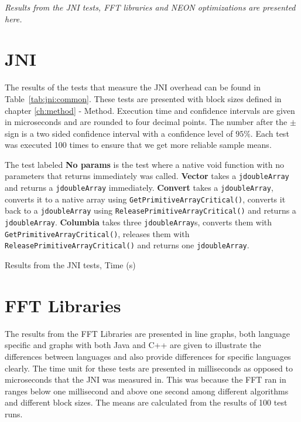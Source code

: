 \textit{Results from the JNI tests, FFT libraries and NEON optimizations are presented here.}

\section{JNI}
The results of the tests that measure the JNI overhead can be found in Table~\ref{tab:jni:common}. These tests are presented with block sizes defined in chapter \ref{ch:method} - Method. Execution time and confidence intervals are given in microseconds and are rounded to four decimal points. The number after the $\pm$ sign is a two sided confidence interval with a confidence level of $95\%$. Each test was executed 100 times to ensure that we get more reliable sample means.

The test labeled \textbf{No params} is the test where a native void function with no parameters that returns immediately was called. \textbf{Vector} takes a \texttt{jdoubleArray} and returns a \texttt{jdoubleArray} immediately. \textbf{Convert} takes a \texttt{jdoubleArray}, converts it to a native array using \texttt{GetPrimitiveArrayCritical()}, converts it back to a \texttt{jdoubleArray} using \texttt{ReleasePrimitiveArrayCritical()} and returns a \texttt{jdoubleArray}. \textbf{Columbia} takes three \texttt{jdoubleArray}s, converts them with \texttt{GetPrimitiveArrayCritical()}, releases them with \texttt{ReleasePrimitiveArrayCritical()} and returns one \texttt{jdoubleArray}.


\begin{table}[H]
    \centering
    \caption{Results from the JNI tests, Time (\textmu s)}
    \label{tab:jni:common}
    
\end{table}



\section{FFT Libraries}
The results from the FFT Libraries are presented in line graphs, both language specific and graphs with both Java and C++ are given to illustrate the differences between languages and also provide differences for specific languages clearly. The time unit for these tests are presented in milliseconds as opposed to microseconds that the JNI was measured in. This was because the FFT ran in ranges below one millisecond and above one second among different algorithms and different block sizes. The means are calculated from the results of 100 test runs.

